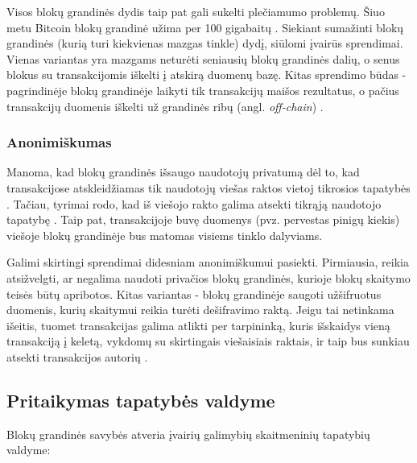 Visos blokų grandinės dydis taip pat gali sukelti plečiamumo problemų. Šiuo metu Bitcoin blokų grandinė užima per 100 gigabaitų \cite{Zheng2017}. Siekiant sumažinti blokų grandinės
(kurią turi kiekvienas mazgas tinkle) dydį,
siūlomi įvairūs sprendimai. Vienas variantas yra mazgams neturėti seniausių blokų grandinės dalių, o senus blokus su transakcijomis iškelti į atskirą duomenų bazę.
Kitas sprendimo būdas - pagrindinėje blokų grandinėje laikyti tik transakcijų maišos rezultatus, o pačius transakcijų duomenis
iškelti už grandinės ribų (angl. \textit{off-chain}) \cite{Lo2017}.

\subsubsection{Anonimiškumas}

Manoma, kad blokų grandinės išsaugo naudotojų privatumą dėl to, kad transakcijose atskleidžiamas tik naudotojų
viešas raktos vietoj tikrosios tapatybės \cite{Zheng2017}. Tačiau, tyrimai rodo, kad iš viešojo rakto galima
atsekti tikrąją naudotojo tapatybę \cite{Barcelo2007}. Taip pat, transakcijoje buvę duomenys (pvz. pervestas pinigų kiekis)
viešoje blokų grandinėje bus matomas visiems tinklo dalyviams.

Galimi skirtingi sprendimai didesniam anonimiškumui pasiekti. Pirmiausia, reikia atsižvelgti, ar negalima naudoti privačios blokų grandinės, kurioje
blokų skaitymo teisės būtų apribotos. Kitas variantas - blokų grandinėje saugoti užšifruotus duomenis, kurių skaitymui
reikia turėti dešifravimo raktą. Jeigu tai netinkama išeitis, tuomet transakcijas galima atlikti per tarpininką, kuris išskaidys vieną transakciją
į keletą, vykdomų su skirtingais viešaisiais raktais, ir taip bus sunkiau atsekti transakcijos autorių \cite{Zheng2017}.

\subsection{Pritaikymas tapatybės valdyme} \label{blockchain:suitabilityForIDM}

Blokų grandinės savybės atveria įvairių galimybių skaitmeninių tapatybių valdyme:

